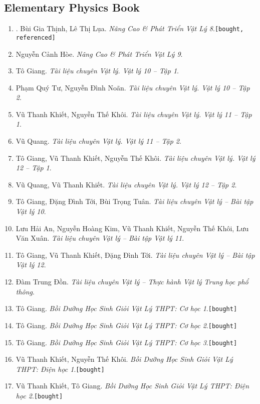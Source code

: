 \documentclass{article}
\numberwithin{equation}{section}
\begin{document}
\subsection{Elementary Physics Book}
\begin{enumerate}
	\item \cite{Thinh_Lua2021}. Bùi Gia Thịnh, Lê Thị Lụa. \textit{Nâng Cao \& Phát Triển Vật Lý 8}.\hfill\texttt{[bought, referenced]}
	\item Nguyễn Cảnh Hòe. \textit{Nâng Cao \& Phát Triển Vật Lý 9}.
	
	
	\item Tô Giang. \textit{Tài liệu chuyên Vật lý. Vật lý 10 -- Tập 1}.
	\item Phạm Quý Tư, Nguyễn Đình Noãn. \textit{Tài liệu chuyên Vật lý. Vật lý 10 -- Tập 2}.
	\item Vũ Thanh Khiết, Nguyễn Thế Khôi. \textit{Tài liệu chuyên Vật lý. Vật lý 11 -- Tập 1}.
	\item Vũ Quang. \textit{Tài liệu chuyên Vật lý. Vật lý 11 -- Tập 2}.
	\item Tô Giang, Vũ Thanh Khiết, Nguyễn Thế Khôi. \textit{Tài liệu chuyên Vật lý. Vật lý 12 -- Tập 1}.
	\item Vũ Quang, Vũ Thanh Khiết. \textit{Tài liệu chuyên Vật lý. Vật lý 12 -- Tập 2}.
	\item Tô Giang, Đặng Đình Tới, Bùi Trọng Tuân. \textit{Tài liệu chuyên Vật lý -- Bài tập Vật lý 10}.
	\item Lưu Hải An, Nguyễn Hoàng Kim, Vũ Thanh Khiết, Nguyễn Thế Khôi, Lưu Văn Xuân. \textit{Tài liệu chuyên Vật lý -- Bài tập Vật lý 11}.
	\item Tô Giang, Vũ Thanh Khiết, Đặng Đình Tới. \textit{Tài liệu chuyên Vật lý -- Bài tập Vật lý 12}.
	\item Đàm Trung Đồn. \textit{Tài liệu chuyên Vật lý -- Thực hành Vật lý Trung học phổ thông}.
	\item Tô Giang. \textit{Bồi Dưỡng Học Sinh Giỏi Vật Lý THPT: Cơ học 1}.\hfill\texttt{[bought]}
	\item Tô Giang. \textit{Bồi Dưỡng Học Sinh Giỏi Vật Lý THPT: Cơ học 2}.\hfill\texttt{[bought]}
	\item Tô Giang. \textit{Bồi Dưỡng Học Sinh Giỏi Vật Lý THPT: Cơ học 3}.\hfill\texttt{[bought]}
	\item Vũ Thanh Khiết, Nguyễn Thế Khôi. \textit{Bồi Dưỡng Học Sinh Giỏi Vật Lý THPT: Điện học 1}.\hfill\texttt{[bought]}
	\item Vũ Thanh Khiết, Tô Giang. \textit{Bồi Dưỡng Học Sinh Giỏi Vật Lý THPT: Điện học 2}.\hfill\texttt{[bought]}

\end{enumerate}
\end{document}
